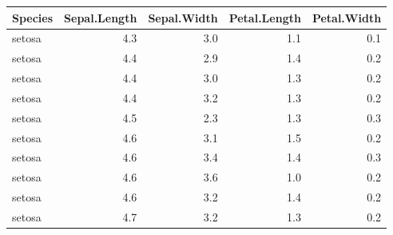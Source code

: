 \documentclass[
]{book}
\newenvironment{Shaded}{\begin{snugshade}}{\end{snugshade}}
\newcommand{\CommentTok}[1]{\textcolor[rgb]{0.56,0.35,0.01}{\textit{#1}}}
\newcommand{\DecValTok}[1]{\textcolor[rgb]{0.00,0.00,0.81}{#1}}
\newcommand{\KeywordTok}[1]{\textcolor[rgb]{0.13,0.29,0.53}{\textbf{#1}}}
\newcommand{\NormalTok}[1]{#1}
\newcommand{\OperatorTok}[1]{\textcolor[rgb]{0.81,0.36,0.00}{\textbf{#1}}}
\newcommand{\StringTok}[1]{\textcolor[rgb]{0.31,0.60,0.02}{#1}}
\begin{document}
\begin{table}[!h]
\centering
\begin{tabular}{l|r|r|r|r}
\hline
Species & Sepal.Length & Sepal.Width & Petal.Length & Petal.Width\\
\hline
\rowcolor{gray!6}  setosa & 4.3 & 3.0 & 1.1 & 0.1\\
\hline
setosa & 4.4 & 2.9 & 1.4 & 0.2\\
\hline
\rowcolor{gray!6}  setosa & 4.4 & 3.0 & 1.3 & 0.2\\
\hline
setosa & 4.4 & 3.2 & 1.3 & 0.2\\
\hline
\rowcolor{gray!6}  setosa & 4.5 & 2.3 & 1.3 & 0.3\\
\hline
setosa & 4.6 & 3.1 & 1.5 & 0.2\\
\hline
\rowcolor{gray!6}  setosa & 4.6 & 3.4 & 1.4 & 0.3\\
\hline
setosa & 4.6 & 3.6 & 1.0 & 0.2\\
\hline
\rowcolor{gray!6}  setosa & 4.6 & 3.2 & 1.4 & 0.2\\
\hline
setosa & 4.7 & 3.2 & 1.3 & 0.2\\
\hline
\end{tabular}
\end{table}

\begin{Shaded}
\end{Shaded}
\end{document}
